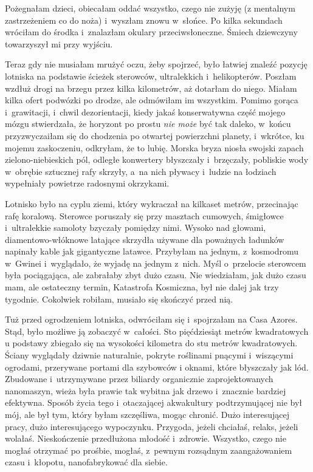\documentclass[oneside,polish,11pt,sfheadings]{mwbk}
\begin{document}
Pożegnałam dzieci, obiecałam oddać wszystko, czego nie zużyję (z
mentalnym zastrzeżeniem co do noża) i~wyszłam znowu w~słońce. Po kilka
sekundach wróciłam do środka i~znalazłam okulary przeciwsłoneczne.
Śmiech dziewczyny towarzyszył mi przy wyjściu.

Teraz gdy nie musiałam mrużyć oczu, żeby spojrzeć, było łatwiej znaleźć
pozycję lotniska na podstawie ścieżek sterowców, ultralekkich i~helikopterów. Poszłam wzdłuż drogi na brzegu przez kilka kilometrów, aż
dotarłam do niego. Miałam kilka ofert podwózki po drodze, ale odmówiłam
im wszystkim. Pomimo gorąca i~grawitacji, i~chwil dezorientacji, kiedy
jakaś konserwatywna część mojego mózgu stwierdzała, że horyzont po
prostu \textit{nie może} być tak daleko, w~końcu przyzwyczaiłam się do
chodzenia po otwartej powierzchni planety, i~wkrótce, ku mojemu
zaskoczeniu, odkryłam, że to lubię. Morska bryza niosła swojski zapach
zielono-niebieskich pól, odległe konwertery błyszczały i~brzęczały,
pobliskie wody w~obrębie sztucznej rafy skrzyły, a~na nich pływacy i~ludzie na łodziach wypełniały powietrze radosnymi okrzykami.

Lotnisko było na cyplu ziemi, który wykraczał na kilkaset metrów,
przecinając rafę koralową. Sterowce poruszały się przy masztach
cumowych, śmigłowce i~ultralekkie samoloty bzyczały pomiędzy nimi.
Wysoko nad głowami, diamentowo-włóknowe latające skrzydła używane dla
poważnych ładunków napinały kable jak gigantyczne latawce. Przybyłam na
jednym, z~kosmodromu w~Gwinei i~wyglądało, że wyjadę na jednym z~nich.
Myśl o~przelocie sterowcem była pociągająca, ale zabrałaby zbyt dużo
czasu. Nie wiedziałam, jak dużo czasu mam, ale ostateczny termin,
Katastrofa Kosmiczna, był nie dalej jak trzy tygodnie. Cokolwiek
robiłam, musiało się skończyć przed nią.

Tuż przed ogrodzeniem lotniska, odwróciłam się i~spojrzałam na Casa
Azores. Stąd, było możliwe ją zobaczyć w~całości. Sto pięćdziesiąt
metrów kwadratowych u podstawy zbiegało się na wysokości kilometra do
stu metrów kwadratowych. Ściany wyglądały dziwnie naturalnie, pokryte
roślinami pnącymi i~wiszącymi ogrodami, przerywane portami dla szybowców
i oknami, które błyszczały jak lód. Zbudowane i~utrzymywane przez
biliardy organicznie zaprojektowanych nanomaszyn, wieża była prawie tak
wybitna jak drzewo i~znacznie bardziej efektywna. Sposób życia tego i~otaczającej akwakultury podtrzymującej nie był mój, ale był tym, który
byłam szczęśliwa, mogąc chronić. Dużo interesującej pracy, dużo
interesującego wypoczynku. Przygoda, jeżeli chciałaś, relaks, jeżeli
wolałaś. Nieskończenie przedłużona młodość i~zdrowie. Wszystko, czego
nie mogłaś otrzymać po prośbie, mogłaś, z~pewnym rozsądnym
zaangażowaniem czasu i~kłopotu, nanofabrykować dla siebie.
\end{document}

